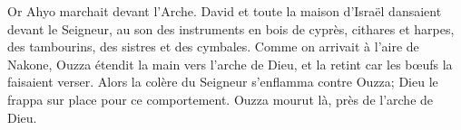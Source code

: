 Or Ahyo marchait devant l’Arche.
David et toute la maison d’Israël dansaient devant le Seigneur,
	au son des instruments en bois de cyprès, cithares et harpes,
	des tambourins, des sistres et des cymbales.
Comme on arrivait à l’aire de Nakone, Ouzza étendit la main vers l’arche de Dieu,
	et la retint car les bœufs la faisaient verser.
Alors la colère du Seigneur s’enflamma contre Ouzza;
	Dieu le frappa sur place pour ce comportement.
Ouzza mourut là, près de l’arche de Dieu.
